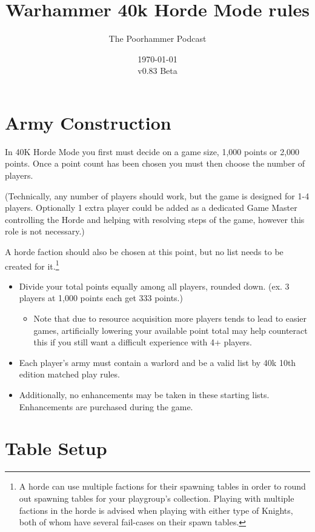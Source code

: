 \documentclass{HordeModeTarot}
\title{Warhammer 40k Horde Mode rules}
\author{The Poorhammer Podcast}
\date{\today \\v0.83 Beta}
\begin{document}
\maketitle

\section{Army Construction}\hypertarget{army-construction}{}\label{army-construction}

In 40K Horde Mode you first must decide on a game size, 1,000 points or 2,000 points.  Once a point count has been chosen you must then choose the number of players.

(Technically, any number of players should work, but the game is designed for 1-4 players. Optionally 1 extra player could be added as a dedicated Game Master controlling the Horde and helping with resolving steps of the game, however this role is not necessary.)

A horde faction should also be chosen at this point, but no list needs to be created for it.\footnote{A horde can use multiple factions for their spawning tables in order to round out spawning tables for your playgroup's collection. Playing with multiple factions in the horde is advised when playing with either type of Knights, both of whom have several fail-cases on their spawn tables.}

\begin{itemize}
\item{} Divide your total points equally among all players, rounded down. (ex. 3 players at 1,000 points each get 333 points.)


\begin{itemize}
\item{} Note that due to resource acquisition more players tends to lead to easier games, artificially lowering your available point total may help counteract this if you still want a difficult experience with 4+ players.
\end{itemize}
\item{} Each player's army must contain a warlord and be a valid list by 40k 10th edition matched play rules.
\item{} Additionally, no enhancements may be taken in these starting lists. Enhancements are purchased during the game.
\end{itemize}

\section{Table Setup}\hypertarget{table-setup}{}\label{table-setup}
\end{document}
